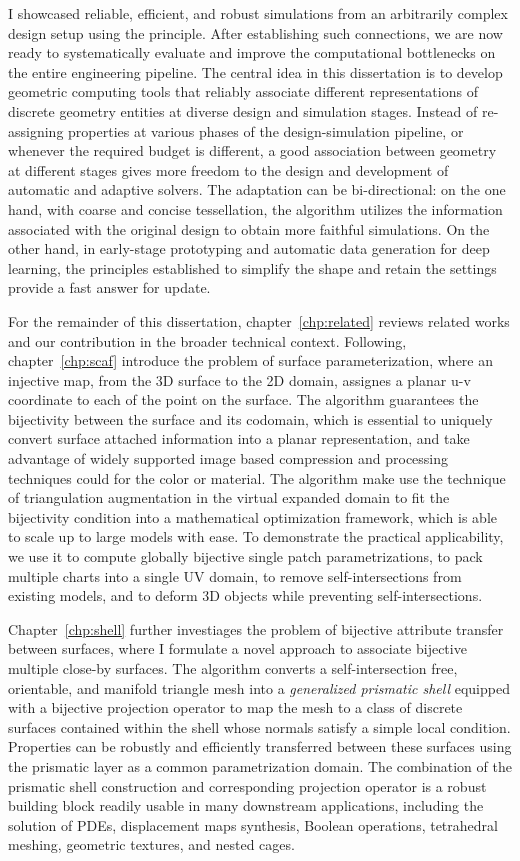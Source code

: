 I showcased reliable, efficient, and robust simulations from an arbitrarily complex design setup using the principle. After establishing such connections, we are now ready to systematically evaluate and improve the computational bottlenecks on the entire engineering pipeline.
The central idea in this dissertation is to develop geometric computing tools that reliably associate different representations of discrete geometry entities at diverse design and simulation stages. 
Instead of re-assigning properties at various phases of the design-simulation pipeline, or whenever the required budget is different, a good association between geometry at different stages gives more freedom to the design and development of automatic and adaptive solvers. The adaptation can be bi-directional: on the one hand, with coarse and concise tessellation, the algorithm utilizes the information associated with the original design to obtain more faithful simulations. On the other hand, in early-stage prototyping and automatic data generation for deep learning, the principles established to simplify the shape and retain the settings provide a fast answer for update. 

For the remainder of this dissertation, chapter~\ref*{chp:related} reviews related works and our contribution in the broader technical context. 
Following, chapter~\ref*{chp:scaf} introduce the problem of surface parameterization, where an injective map, from the 3D surface to the 2D domain, assignes a planar u-v coordinate to each of the point on the surface. The algorithm guarantees the bijectivity between the surface and its codomain, which is essential to uniquely convert surface attached information into a planar representation, and take advantage of widely supported image based compression and processing techniques could for the color or material. 
The algorithm make use the technique of triangulation augmentation in the virtual expanded domain to fit the bijectivity condition into a mathematical optimization framework, which is able to scale up to large models with ease. 
To demonstrate the practical applicability, we use it to compute globally bijective single patch parametrizations, to pack multiple charts into a single UV domain, to remove self-intersections from existing models, and to deform 3D objects while preventing self-intersections.

Chapter~\ref*{chp:shell} further investiages the problem of bijective attribute transfer between surfaces, where I formulate a novel approach to associate bijective multiple close-by surfaces. The algorithm converts a self-intersection free, orientable, and manifold triangle mesh into a \emph{generalized prismatic shell} equipped with a bijective projection operator to map the mesh to {a class of} discrete surfaces contained within the shell whose normals satisfy a simple local condition. 
Properties can be robustly and efficiently transferred between these surfaces using the prismatic layer as a common parametrization domain. 
The combination of the prismatic shell construction and corresponding projection operator is a robust building block readily usable in many downstream applications, including the solution of PDEs, displacement maps synthesis, Boolean operations, tetrahedral meshing, geometric textures, and nested cages.


